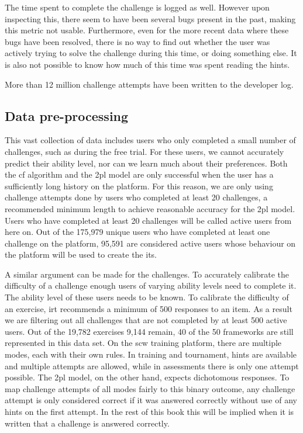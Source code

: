 The time spent to complete the challenge is logged as well.
However upon inspecting this, there seem to have been several bugs present in the past, making this metric not usable.
Furthermore, even for the more recent data where these bugs have been resolved, there is no way to find out whether the user was actively trying to solve the challenge during this time, or doing something else.
It is also not possible to know how much of this time was spent reading the hints.

More than 12 million challenge attempts have been written to the developer log.

\subsection{Data pre-processing}
This vast collection of data includes users who only completed a small number of challenges, such as during the free trial.
For these users, we cannot accurately predict their ability level, nor can we learn much about their preferences.
Both the \gls{cf} algorithm and the \gls{2pl} model are only successful when the user has a sufficiently long history on the platform.
For this reason, we are only using challenge attempts done by users who completed at least 20 challenges, a recommended minimum length to achieve reasonable accuracy for the \gls{2pl} model.
Users who have completed at least 20 challenges will be called active users from here on.
Out of the 175,979 unique users who have completed at least one challenge on the platform, 95,591 are considered active users whose behaviour on the platform will be used to create the \gls{its}.

A similar argument can be made for the challenges.
To accurately calibrate the difficulty of a challenge enough users of varying ability levels need to complete it.
The ability level of these users needs to be known.
To calibrate the difficulty of an exercise, \gls{irt} recommends a minimum of 500 responses to an item.
As a result we are filtering out all challenges that are not completed by at least 500 active users.
Out of the 19,782 exercises 9,144 remain, 40 of the 50 frameworks are still represented in this data set.
On the \gls{scw} training platform, there are multiple modes, each with their own rules.
In training and tournament, hints are available and multiple attempts are allowed, while in assessments there is only one attempt possible.
The \gls{2pl} model, on the other hand, expects dichotomous responses.
To map challenge attempts of all modes fairly to this binary outcome, any challenge attempt is only considered correct if it was answered correctly without use of any hints on the first attempt.
In the rest of this book this will be implied when it is written that a challenge is answered correctly.

